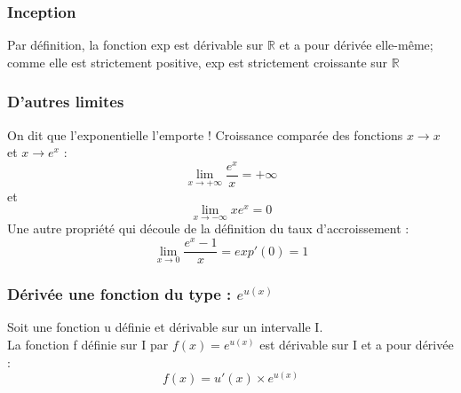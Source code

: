 \documentclass[t]{beamer}
\begin{document}
\begin{frame}
\frametitle{Inception}
\pause
Par définition, la fonction exp est dérivable sur $ \mathbb{R}$ et a pour dérivée elle-même; comme elle est strictement positive, exp est strictement croissante sur $ \mathbb{R}$
\end{frame}

\begin{frame}
\frametitle{D'autres limites}
On dit que l'exponentielle l'emporte !
Croissance comparée des fonctions $x \rightarrow x$ et $x \rightarrow e^x$ :
\[ \lim\limits_{x \rightarrow + \infty} \dfrac{e^x}{x} = + \infty \]
et
\[ \lim\limits_{x \rightarrow - \infty} xe^x = 0\]
Une autre propriété qui découle de la définition du taux d'accroissement :
\[ \lim\limits_{x \rightarrow 0} \dfrac{e^x - 1}{x} = exp'(0) = 1\]
\end{frame}

\begin{frame}
\frametitle{Dérivée une fonction du type : $ e^{u(x)} $}
\pause
Soit une fonction u définie et dérivable sur un intervalle I. \\
La fonction f définie sur I par $f(x) = e^{u(x)}$ est dérivable sur I et a pour dérivée : 
\[f(x) = u'(x) \times e^{u(x)} \]
\end{frame}
\end{document}
